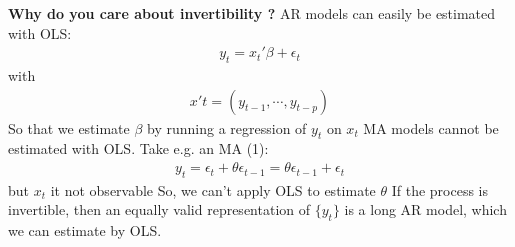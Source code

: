 \documentclass[a4paper,twoside,11pt]{article}
\begin{document}
\begin{shaded*}
\noindent \textbf{Why do you care about invertibility ? } 
\newline
AR models can easily be estimated with OLS:
\begin{equation*}
\begin{aligned}
y_t = x_t' \beta + \epsilon_t
\end{aligned}
\end{equation*}
with 
\begin{equation*}
\begin{aligned}
x't = (y_{t-1}, \cdots , y_{t-p})
\end{aligned}
\end{equation*}
So that we estimate $\beta$ by running a regression of $y_t$ on $x_t$ 
\newline
\newline
MA models cannot be estimated with OLS. Take e.g. an MA (1):
\begin{equation*}
\begin{aligned}
y_t = \epsilon_t +\theta \epsilon_{t-1} = \theta \epsilon_{t-1} + \epsilon_t
\end{aligned}
\end{equation*}
but $x_t$ it not observable 
\newline
\textcolor{NavyBlue}{So, we can't apply OLS to estimate $\theta$}
\newline
\newline
\textcolor{NavyBlue}{ If the process is invertible, then an equally valid representation of $\{y_t\}$ is a long AR model, which we can estimate by OLS.}
\end{shaded*}
\end{document}
